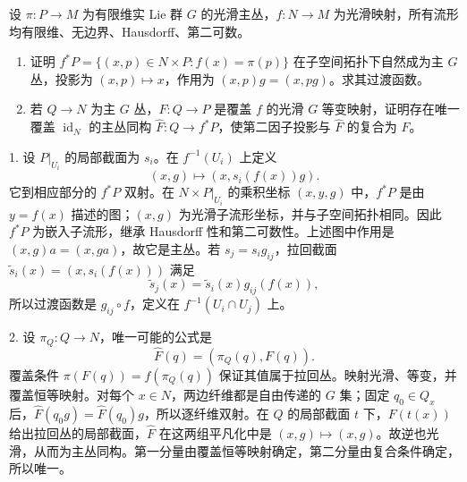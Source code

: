\begin{exercise}\label{g1:ex:principal-pullback}
	设 \(\pi:P\to M\) 为有限维实 Lie 群 \(G\) 的光滑主丛，\(f:N\to M\) 为光滑映射，所有流形均有限维、无边界、Hausdorff、第二可数。
	\begin{enumerate}
		\item 证明 \(f^*P=\{(x,p)\in N\times P:f(x)=\pi(p)\}\) 在子空间拓扑下自然成为主 \(G\) 丛，投影为 \((x,p)\mapsto x\)，作用为 \((x,p)g=(x,pg)\)。求其过渡函数。
		\item 若 \(Q\to N\) 为主 \(G\) 丛，\(F:Q\to P\) 是覆盖 \(f\) 的光滑 \(G\) 等变映射，证明存在唯一覆盖 \(\operatorname{id}_N\) 的主丛同构 \(\widehat F:Q\to f^*P\)，使第二因子投影与 \(\widehat F\) 的复合为 \(F\)。
	\end{enumerate}
\end{exercise}
\begin{solution}
	1. 设 \(P|_{U_i}\) 的局部截面为 \(s_i\)。在 \(f^{-1}(U_i)\) 上定义
	\[
		(x,g)\longmapsto(x,s_i(f(x))g).
	\]
	它到相应部分的 \(f^*P\) 双射。在 \(N\times P|_{U_i}\) 的乘积坐标 \((x,y,g)\) 中，\(f^*P\) 是由 \(y=f(x)\) 描述的图；\((x,g)\) 为光滑子流形坐标，并与子空间拓扑相同。因此 \(f^*P\) 为嵌入子流形，继承 Hausdorff 性和第二可数性。上述图中作用是 \((x,g)a=(x,ga)\)，故它是主丛。若 \(s_j=s_i g_{ij}\)，拉回截面 \(\widetilde s_i(x)=(x,s_i(f(x)))\) 满足
	\[
		\widetilde s_j(x)=\widetilde s_i(x)g_{ij}(f(x)),
	\]
	所以过渡函数是 \(g_{ij}\circ f\)，定义在 \(f^{-1}(U_i\cap U_j)\) 上。

	2. 设 \(\pi_Q:Q\to N\)，唯一可能的公式是
	\[
		\widehat F(q)=(\pi_Q(q),F(q)).
	\]
	覆盖条件 \(\pi(F(q))=f(\pi_Q(q))\) 保证其值属于拉回丛。映射光滑、等变，并覆盖恒等映射。对每个 \(x\in N\)，两边纤维都是自由传递的 \(G\) 集；固定 \(q_0\in Q_x\) 后，\(\widehat F(q_0g)=\widehat F(q_0)g\)，所以逐纤维双射。在 \(Q\) 的局部截面 \(t\) 下，\(F(t(x))\) 给出拉回丛的局部截面，\(\widehat F\) 在这两组平凡化中是 \((x,g)\mapsto(x,g)\)。故逆也光滑，从而为主丛同构。第一分量由覆盖恒等映射确定，第二分量由复合条件确定，所以唯一。
\end{solution}

